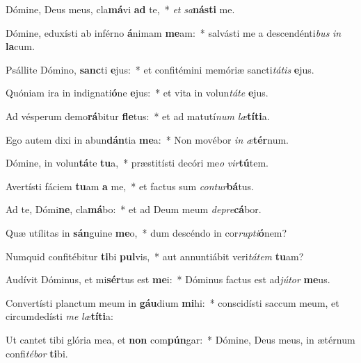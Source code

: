 \item Dómine, Deus meus, cla\textbf{má}vi \textbf{ad} te,~* \textit{et} \textit{sa}\textbf{nás}\textbf{ti} me.
\item Dómine, eduxísti ab inférno \textbf{á}nimam \textbf{me}am:~* salvásti me a descendénti\textit{bus} \textit{in} \textbf{la}cum.
\item Psállite Dómino, \textbf{sanc}ti \textbf{e}jus:~* et confitémini memóriæ sancti\textit{tá}\textit{tis} \textbf{e}jus.
\item Quóniam ira in indignati\textbf{ó}ne \textbf{e}jus:~* et vita in volun\textit{tá}\textit{te} \textbf{e}jus.
\item Ad vésperum demo\textbf{rá}bitur \textbf{fle}tus:~* et ad matutí\textit{num} \textit{læ}\textbf{tí}\textbf{ti}a.
\item Ego autem dixi in abun\textbf{dán}tia \textbf{me}a:~* Non movébor \textit{in} \textit{æ}\textbf{tér}num.
\item Dómine, in volun\textbf{tá}te \textbf{tu}a,~* præstitísti decóri me\textit{o} \textit{vir}\textbf{tú}tem.
\item Avertísti fáciem \textbf{tu}am \textbf{a} me,~* et factus sum \textit{con}\textit{tur}\textbf{bá}tus.
\item Ad te, Dómi\textbf{ne}, cla\textbf{má}bo:~* et ad Deum meum \textit{de}\textit{pre}\textbf{cá}bor.
\item Quæ utílitas in \textbf{sán}guine \textbf{me}o,~* dum descéndo in cor\textit{rup}\textit{ti}\textbf{ó}nem?
\item Numquid confitébitur \textbf{ti}bi \textbf{pul}vis,~* aut annuntiábit veri\textit{tá}\textit{tem} \textbf{tu}am?
\item Audívit Dóminus, et mi\textbf{sér}tus est \textbf{me}i:~* Dóminus factus est ad\textit{jú}\textit{tor} \textbf{me}us.
\item Convertísti planctum meum in \textbf{gáu}dium \textbf{mi}hi:~* conscidísti saccum meum, et circumdedísti \textit{me} \textit{læ}\textbf{tí}\textbf{ti}a:
\item Ut cantet tibi glória mea, et \textbf{non} com\textbf{pún}gar:~* Dómine, Deus meus, in ætérnum confi\textit{té}\textit{bor} \textbf{ti}bi.
